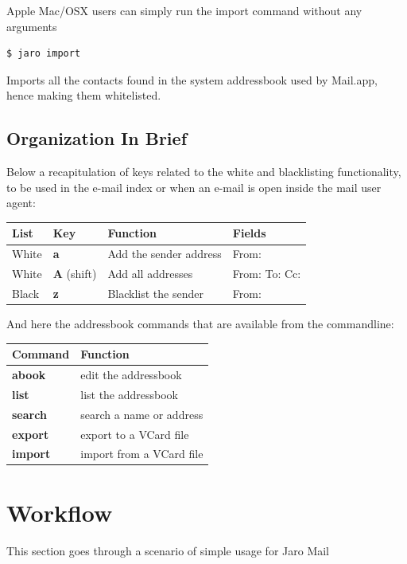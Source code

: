 \documentclass[a4,onecolumn,portrait]{article}
\begin{document}
Apple Mac/OSX users can simply run the import command without any arguments

\begin{verbatim}
$ jaro import
\end{verbatim}

Imports all the contacts found in the system addressbook used by Mail.app,
hence making them whitelisted.
\subsection{Organization In Brief}
\label{sec-5-5}

Below a recapitulation of keys related to the white and blacklisting
functionality, to be used in the e-mail index or when an e-mail is
open inside the mail user agent:

\begin{center}
\begin{tabular}{llll}
List & Key & Function & Fields\\
\hline
White & \textbf{a} & Add the sender address & From:\\
White & \textbf{A} (shift) & Add all addresses & From: To: Cc:\\
Black & \textbf{z} & Blacklist the sender & From:\\
\end{tabular}
\end{center}

And here the addressbook commands that are available from the
commandline:

\begin{center}
\begin{tabular}{ll}
Command & Function\\
\hline
\textbf{abook} & edit the addressbook\\
\textbf{list} & list the addressbook\\
\textbf{search} & search a name or address\\
\textbf{export} & export to a VCard file\\
\textbf{import} & import from a VCard file\\
\end{tabular}
\end{center}
\section{Workflow}
\label{sec-6}

This section goes through a scenario of simple usage for Jaro Mail
\end{document}
